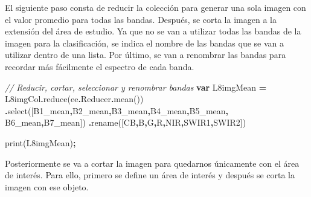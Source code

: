 \documentclass[
  12pt,
  letterpaper,
  twoside]{book}
\newenvironment{Shaded}{\begin{snugshade}}{\end{snugshade}}
\newcommand{\AttributeTok}[1]{\textcolor[rgb]{0.77,0.63,0.00}{#1}}
\newcommand{\CommentTok}[1]{\textcolor[rgb]{0.56,0.35,0.01}{\textit{#1}}}
\newcommand{\FunctionTok}[1]{\textcolor[rgb]{0.00,0.00,0.00}{#1}}
\newcommand{\KeywordTok}[1]{\textcolor[rgb]{0.13,0.29,0.53}{\textbf{#1}}}
\newcommand{\NormalTok}[1]{#1}
\newcommand{\OperatorTok}[1]{\textcolor[rgb]{0.81,0.36,0.00}{\textbf{#1}}}
\newcommand{\StringTok}[1]{\textcolor[rgb]{0.31,0.60,0.02}{#1}}
\begin{document}
El siguiente paso consta de reducir la colección para generar una sola imagen con el valor promedio para todas las bandas. Después, se corta la imagen a la extensión del área de estudio. Ya que no se van a utilizar todas las bandas de la imagen para la clasificación, se indica el nombre de las bandas que se van a utilizar dentro de una lista. Por último, se van a renombrar las bandas para recordar más fácilmente el espectro de cada banda.

\begin{Shaded}
\begin{Highlighting}[]
\CommentTok{// Reducir, cortar, seleccionar y renombrar bandas}
\KeywordTok{var}\NormalTok{ L8imgMean }\OperatorTok{=}\NormalTok{ L8imgCol}\OperatorTok{.}\FunctionTok{reduce}\NormalTok{(ee}\OperatorTok{.}\AttributeTok{Reducer}\OperatorTok{.}\FunctionTok{mean}\NormalTok{())}
  \OperatorTok{.}\FunctionTok{select}\NormalTok{([}\StringTok{\textquotesingle{}B1\_mean\textquotesingle{}}\OperatorTok{,}\StringTok{\textquotesingle{}B2\_mean\textquotesingle{}}\OperatorTok{,}\StringTok{\textquotesingle{}B3\_mean\textquotesingle{}}\OperatorTok{,}\StringTok{\textquotesingle{}B4\_mean\textquotesingle{}}\OperatorTok{,}\StringTok{\textquotesingle{}B5\_mean\textquotesingle{}}\OperatorTok{,}
  \StringTok{\textquotesingle{}B6\_mean\textquotesingle{}}\OperatorTok{,}\StringTok{\textquotesingle{}B7\_mean\textquotesingle{}}\NormalTok{])}
  \OperatorTok{.}\FunctionTok{rename}\NormalTok{([}\StringTok{\textquotesingle{}CB\textquotesingle{}}\OperatorTok{,}\StringTok{\textquotesingle{}B\textquotesingle{}}\OperatorTok{,}\StringTok{\textquotesingle{}G\textquotesingle{}}\OperatorTok{,}\StringTok{\textquotesingle{}R\textquotesingle{}}\OperatorTok{,}\StringTok{\textquotesingle{}NIR\textquotesingle{}}\OperatorTok{,}\StringTok{\textquotesingle{}SWIR1\textquotesingle{}}\OperatorTok{,}\StringTok{\textquotesingle{}SWIR2\textquotesingle{}}\NormalTok{])}

\FunctionTok{print}\NormalTok{(L8imgMean)}\OperatorTok{;}
\end{Highlighting}
\end{Shaded}

Posteriormente se va a cortar la imagen para quedarnos únicamente con el área de interés. Para ello, primero se define un área de interés y después se corta la imagen con ese objeto.
\end{document}

